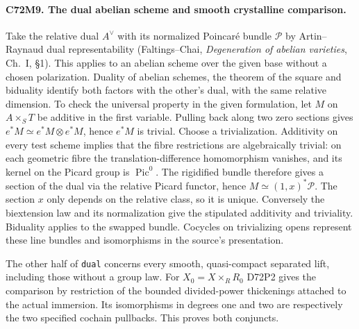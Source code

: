 \paragraph{C72M9. The dual abelian scheme and smooth crystalline comparison.}
Take the relative dual $A^\vee$ with its normalized Poincaré bundle
$\mathcal P$ by Artin--Raynaud dual representability (Faltings--Chai,
\emph{Degeneration of abelian varieties}, Ch.~I, \S1). This applies
to an abelian scheme over the given base without a chosen polarization.
Duality of abelian schemes, the theorem of the square
and biduality identify both factors with the other's dual, with the
same relative dimension. To check the universal property in the
given formulation, let $M$ on $A\times_S T$ be additive in the first
variable. Pulling back along two zero sections gives
$e^*M\simeq e^*M\otimes e^*M$, hence $e^*M$ is trivial. Choose
a trivialization. Additivity on every test scheme implies that
the fibre restrictions are algebraically trivial: on each geometric
fibre the translation-difference homomorphism vanishes, and its kernel
on the Picard group is $\operatorname{Pic}^0$. The rigidified bundle
therefore gives a section of the dual via the relative Picard
functor, hence $M\simeq(1,x)^*\mathcal P$. The section $x$ only
depends on the relative class, so it is unique. Conversely the
biextension law and its normalization give the stipulated additivity
and triviality. Biduality applies to the swapped bundle. Cocycles
on trivializing opens represent these line bundles and isomorphisms
in the source's presentation.

The other half of \texttt{dual} concerns every smooth,
quasi-compact separated lift, including those without a group law.
For $X_0=X\times_R R_0$ D72P2 gives the comparison by restriction
of the bounded divided-power thickenings attached to the actual
immersion. Its isomorphisms in degrees one and two are respectively
the two specified cochain pullbacks. This proves both conjuncts.

